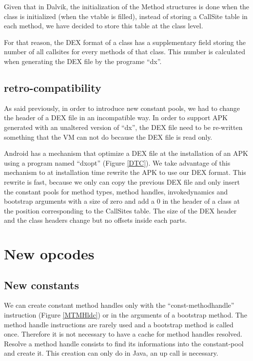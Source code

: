 \documentclass{sig-alternate}
\def \DALVIK{Dalvik\xspace}
\def \ANDROID{Android\xspace}
\begin{document}
    Given that in \DALVIK, the initialization of the Method structures is done when
    the class is initialized (when the vtable is filled), instead of storing a CallSite
    table in each method, we have decided to store this table at the class level.
    
    For that reason, the DEX format of a class has a supplementary field storing
    the number of all callsites for every methods of that class. 
    This number is calculated when generating the DEX file by the programe ``dx''.

  \subsection{retro-compatibility}
    \label{retro}

    As said previously, in order to introduce new constant pools, we had to change
    the header of a DEX file in an incompatible way.
    In order to support APK generated with an unaltered version of ``dx'',
    the DEX file need to be re-written something that the VM can not do
    because the DEX file is read only.

    \ANDROID has a mechanism that optimize a DEX file at the installation of
    an APK using a program named ``dxopt'' (Figure \ref{DTC}).
    We take advantage of this mechanism to at installation time rewrite the APK to use our DEX format.
    This rewrite is fast, because we only can copy the previous DEX file and only insert the
    constant pools for method types, method handles, invokedynamics and
    bootstrap arguments with a size of zero and add a 0 in the header of a class at the
    position corresponding to the CallSites table.
    The size of the DEX header and the class headers change but no offsets inside each parts.

\section{New opcodes}
\label{newConst}
  \subsection{New constants}

    We can create constant method handles only with the ``const-methodhandle'' instruction (Figure \ref{MTMHldc}) or in the arguments of a bootstrap method.
    The method handle instructions are rarely used and a bootstrap method is called once.
    Therefore it is not necessary to have a cache for method handles resolved.
    Resolve a method handle consists to find its informations into the constant-pool and create it.
    This creation can only do in Java, an up call is necessary.
\end{document}
